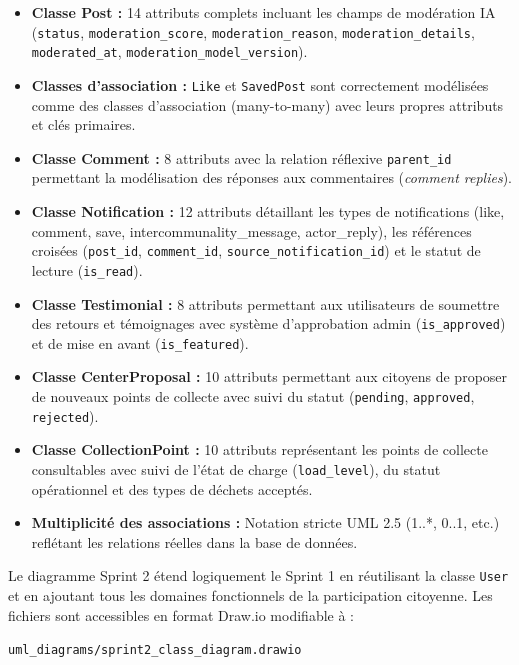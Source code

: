 \begin{itemize}
    \item \textbf{Classe Post :} 14 attributs complets incluant les champs de modération IA (\texttt{status}, \texttt{moderation\_score}, \texttt{moderation\_reason}, \texttt{moderation\_details}, \texttt{moderated\_at}, \texttt{moderation\_model\_version}).
    
    \item \textbf{Classes d'association :} \texttt{Like} et \texttt{SavedPost} sont correctement modélisées comme des classes d'association (many-to-many) avec leurs propres attributs et clés primaires.
    
    \item \textbf{Classe Comment :} 8 attributs avec la relation réflexive \texttt{parent\_id} permettant la modélisation des réponses aux commentaires (\textit{comment replies}).
    
    \item \textbf{Classe Notification :} 12 attributs détaillant les types de notifications (like, comment, save, intercommunality\_message, actor\_reply), les références croisées (\texttt{post\_id}, \texttt{comment\_id}, \texttt{source\_notification\_id}) et le statut de lecture (\texttt{is\_read}).
    
    \item \textbf{Classe Testimonial :} 8 attributs permettant aux utilisateurs de soumettre des retours et témoignages avec système d'approbation admin (\texttt{is\_approved}) et de mise en avant (\texttt{is\_featured}).
    
    \item \textbf{Classe CenterProposal :} 10 attributs permettant aux citoyens de proposer de nouveaux points de collecte avec suivi du statut (\texttt{pending}, \texttt{approved}, \texttt{rejected}).
    
    \item \textbf{Classe CollectionPoint :} 10 attributs représentant les points de collecte consultables avec suivi de l'état de charge (\texttt{load\_level}), du statut opérationnel et des types de déchets acceptés.
    
    \item \textbf{Multiplicité des associations :} Notation stricte UML 2.5 (1..*, 0..1, etc.) reflétant les relations réelles dans la base de données.
\end{itemize}

Le diagramme Sprint 2 étend logiquement le Sprint 1 en réutilisant la classe \texttt{User} et en ajoutant tous les domaines fonctionnels de la participation citoyenne. Les fichiers sont accessibles en format Draw.io modifiable à :
\begin{center}
    \texttt{uml\_diagrams/sprint2\_class\_diagram.drawio}
\end{center}

